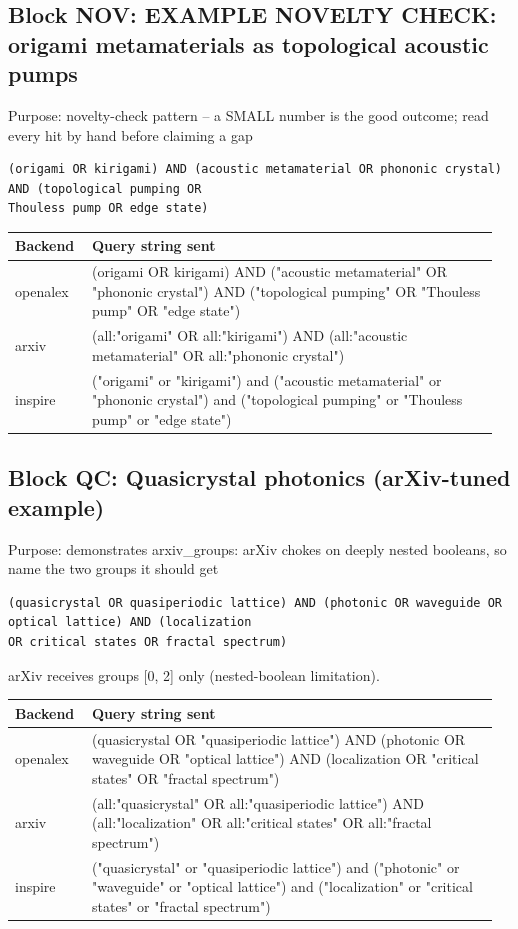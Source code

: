 \documentclass[10pt,a4paper]{article}
\begin{document}
\subsection*{Block NOV: EXAMPLE NOVELTY CHECK: origami metamaterials as topological acoustic pumps}
Purpose: novelty-check pattern -- a SMALL number is the good outcome; read every hit by hand before claiming a gap

\begin{Verbatim}[fontsize=\scriptsize]
(origami OR kirigami) AND (acoustic metamaterial OR phononic crystal) AND (topological pumping OR 
Thouless pump OR edge state)
\end{Verbatim}
{\scriptsize\begin{longtable}{p{0.151\linewidth}p{0.804\linewidth}}
\hline
\textbf{Backend} & \textbf{Query string sent} \\ \hline
\endhead
openalex & (origami OR kirigami) AND ("acoustic metamaterial" OR "phononic crystal") AND ("topological pumping" OR "Thouless pump" OR "edge state") \\
arxiv & (all:"origami" OR all:"kirigami") AND (all:"acoustic metamaterial" OR all:"phononic crystal") \\
inspire & ("origami" or "kirigami") and ("acoustic metamaterial" or "phononic crystal") and ("topological pumping" or "Thouless pump" or "edge state") \\
\hline
\end{longtable}}
\subsection*{Block QC: Quasicrystal photonics (arXiv-tuned example)}
Purpose: demonstrates arxiv\_groups: arXiv chokes on deeply nested booleans, so name the two groups it should get

\begin{Verbatim}[fontsize=\scriptsize]
(quasicrystal OR quasiperiodic lattice) AND (photonic OR waveguide OR optical lattice) AND (localization 
OR critical states OR fractal spectrum)
\end{Verbatim}
arXiv receives groups {[}0, 2{]} only (nested-boolean limitation).

{\scriptsize\begin{longtable}{p{0.151\linewidth}p{0.804\linewidth}}
\hline
\textbf{Backend} & \textbf{Query string sent} \\ \hline
\endhead
openalex & (quasicrystal OR "quasiperiodic lattice") AND (photonic OR waveguide OR "optical lattice") AND (localization OR "critical states" OR "fractal spectrum") \\
arxiv & (all:"quasicrystal" OR all:"quasiperiodic lattice") AND (all:"localization" OR all:"critical states" OR all:"fractal spectrum") \\
inspire & ("quasicrystal" or "quasiperiodic lattice") and ("photonic" or "waveguide" or "optical lattice") and ("localization" or "critical states" or "fractal spectrum") \\
\hline
\end{longtable}}
\end{document}
